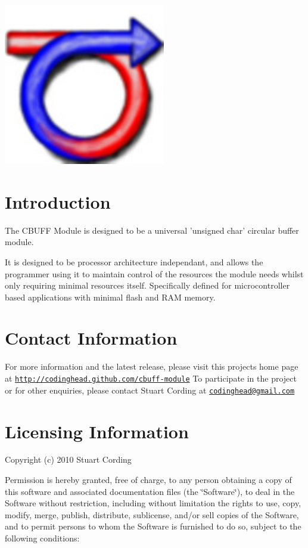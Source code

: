  
\begin{DoxyImageNoCaption}
  \mbox{\includegraphics{cbuff-module_final_small}}
\end{DoxyImageNoCaption}
 \hypertarget{main_intro}{}\section{Introduction}\label{main_intro}
The CBUFF Module is designed to be a universal 'unsigned char' circular buffer module.

It is designed to be processor architecture independant, and allows the programmer using it to maintain control of the resources the module needs whilst only requiring minimal resources itself. Specifically defined for microcontroller based applications with minimal flash and RAM memory.\hypertarget{main_contactInfo}{}\section{Contact Information}\label{main_contactInfo}
For more information and the latest release, please visit this projects home page at \href{http://codinghead.github.com/cbuff-module}{\tt http://codinghead.github.com/cbuff-\/module} To participate in the project or for other enquiries, please contact Stuart Cording at \href{mailto:codinghead@gmail.com}{\tt codinghead@gmail.com}\hypertarget{main_license}{}\section{Licensing Information}\label{main_license}
Copyright (c) 2010 Stuart Cording

Permission is hereby granted, free of charge, to any person obtaining a copy of this software and associated documentation files (the \char`\"{}Software\char`\"{}), to deal in the Software without restriction, including without limitation the rights to use, copy, modify, merge, publish, distribute, sublicense, and/or sell copies of the Software, and to permit persons to whom the Software is furnished to do so, subject to the following conditions:

